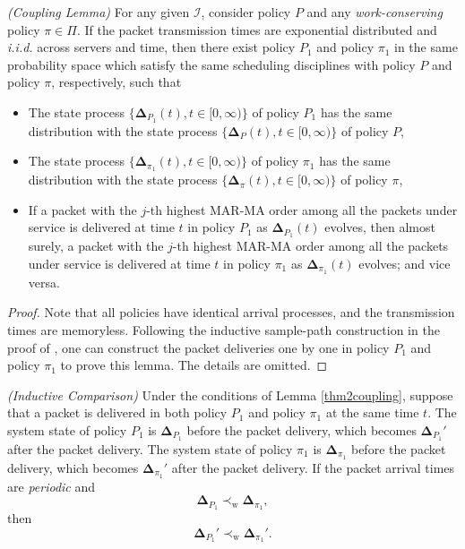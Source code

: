 {\begin{lemma}\emph{(Coupling Lemma)}\label{thm2coupling}
For any given $\mathcal{I}$, consider policy $P$ and any \emph{work-conserving} policy $\pi\in \Pi$. If  the packet transmission times are exponential distributed and \emph{i.i.d.} across servers and time,   
 then there exist policy $P_1$ and  policy $\pi_1$ in the same probability space which satisfy the same scheduling disciplines with policy $P$ and policy $\pi$, respectively,  such that 
\begin{itemize}
\itemsep0em 
\item[1.] The state process $\{\bm\Delta_{P_1}(t),t\in [0,\infty)\}$ of policy $P_1$ has the same distribution with the state process $\{\bm\Delta_{P}(t),t\in [0,\infty)\}$ of policy $P$,
\item[2.] The state process $\{\bm\Delta_{\pi_1}(t),t\in [0,\infty)\}$ of policy $\pi_1$ has the same distribution with the state process $\{\bm\Delta_{\pi}(t),t\in [0,\infty)\}$  of policy $\pi$,
\item[3.] If a packet with the $j$-th highest MAR-MA order among all the packets under service is delivered at time $t$ in policy $P_1$ as $\bm\Delta_{P_1}(t)$ evolves, then almost surely, a packet  with the $j$-th highest MAR-MA order among all the packets under service is  delivered at time $t$ in policy $\pi_1$ as $\bm\Delta_{\pi_1}(t)$ evolves; and vice versa. 
\end{itemize} 
\end{lemma}
\begin{proof}
Note that all policies have identical arrival processes, and the transmission times are  memoryless. Following the inductive sample-path construction in the proof of \cite[Theorem 6.B.3]{StochasticOrderBook}, one can construct the packet deliveries one by one in policy $P_1$ and policy $\pi_1$ to prove this lemma. The details are omitted. 
\end{proof}

\begin{lemma} \emph{(Inductive Comparison)}\label{thm2lem2}
Under the conditions of Lemma \ref{thm2coupling}, 
suppose that a packet is delivered in both policy $P_1$ and policy $\pi_1$  at the same time $t$. The system state  of policy $P_1$ is $\bm\Delta_{P_1}$ before the packet delivery, which becomes $\bm\Delta_{P_1}'$ after the packet delivery. The system state  of policy $\pi_1$ is $\bm\Delta_{\pi_1}$ before the packet delivery, which becomes $\bm\Delta_{\pi_1}'$ after the packet delivery. If  the packet arrival times are  \emph{periodic} and
\begin{equation}\label{thm2hyp1}
\bm\Delta_{P_1} \prec_{\text{w}} \bm\Delta_{\pi_1},
\end{equation}
then
\begin{equation}\label{thm2law6}
\bm\Delta_{P_1}' \prec_{\text{w}} \bm\Delta_{\pi_1}'.
\end{equation}  
\end{lemma}

}
